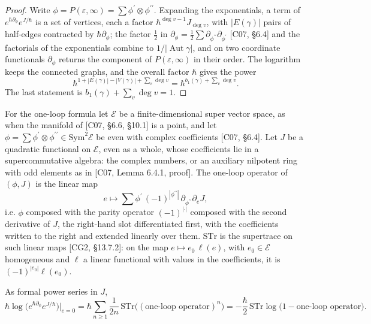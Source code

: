 \begin{proof}
Write $\phi=P(\varepsilon,\infty)=\sum\phi^{\prime}\otimes\phi^{\prime\prime}$. Expanding the exponentials, a term of $e^{\hbar\partial_\phi}e^{J/\hbar}$ is a set of vertices, each a factor $\hbar^{\deg v-1}J_{\deg v}$, with $|E(\gamma)|$ pairs of half-edges contracted by $\hbar\partial_\phi$; the factor $\frac12$ in $\partial_\phi=\frac12\sum\partial_{\phi^{\prime\prime}}\partial_{\phi^{\prime}}$ [C07, §6.4] and the factorials of the exponentials combine to $1/|\operatorname{Aut}\gamma|$, and on two coordinate functionals $\partial_\phi$ returns the component of $P(\varepsilon,\infty)$ in their order. The logarithm keeps the connected graphs, and the overall factor $\hbar$ gives the power
\[
\hbar^{1+|E(\gamma)|-|V(\gamma)|+\sum_v\deg v}=\hbar^{b_1(\gamma)+\sum_v\deg v}.
\]
The last statement is $b_1(\gamma)+\sum_v\deg v=1$.
\end{proof}

For the one-loop formula let $\mathscr E$ be a finite-dimensional super vector space, as when the manifold of [C07, §6.6, §10.1] is a point, and let $\phi=\sum\phi^{\prime}\otimes\phi^{\prime\prime}\in\mathrm{Sym}^2\mathscr E$ be even with complex coefficients [C07, §6.4]. Let $J$ be a quadratic functional on $\mathscr E$, even as a whole, whose coefficients lie in a supercommutative algebra: the complex numbers, or an auxiliary nilpotent ring with odd elements as in [C07, Lemma 6.4.1, proof]. The one-loop operator of $(\phi,J)$ is the linear map
\[
e\mapsto\sum\phi^{\prime}\,(-1)^{|\phi^{\prime\prime}|}\,\partial_{\phi^{\prime\prime}}\partial_eJ ,
\]
i.e. $\phi$ composed with the parity operator $(-1)^{|\cdot|}$ composed with the second derivative of $J$, the right-hand slot differentiated first, with the coefficients written to the right and extended linearly over them. $\mathrm{STr}$ is the supertrace on such linear maps [CG2, §13.7.2]: on the map $e\mapsto e_0\,\ell(e)$, with $e_0\in\mathscr E$ homogeneous and $\ell$ a linear functional with values in the coefficients, it is $(-1)^{|e_0|}\ell(e_0)$.

\begin{proposition}
\label{prop:c3-oneloop}
As formal power series in $J$,
\begin{equation}
\hbar\log\big(e^{\hbar\partial_\phi}e^{J/\hbar}\big)\Big|_{e=0}=\hbar\sum_{n\ge1}\frac1{2n}\,\mathrm{STr}\big((\text{one-loop operator})^n\big)=-\frac\hbar2\,\mathrm{STr}\log\big(1-\text{one-loop operator}\big).
\label{eq:c3-oneloop}
\end{equation}
\end{proposition}


